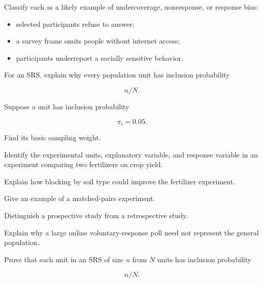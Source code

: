\begin{exercise}[2]
Classify each as a likely example of undercoverage, nonresponse, or
response bias:
\begin{itemize}
    \item selected participants refuse to answer;
    \item a survey frame omits people without internet access;
    \item participants underreport a socially sensitive behavior.
\end{itemize}
\end{exercise}

\begin{exercise}[2]
For an SRS, explain why every population unit has inclusion probability

\[
n/N.
\]
\end{exercise}

\begin{exercise}[2]
Suppose a unit has inclusion probability

\[
\pi_i=0.05.
\]

Find its basic sampling weight.
\end{exercise}

\begin{exercise}[2]
Identify the experimental units, explanatory variable, and response
variable in an experiment comparing two fertilizers on crop yield.
\end{exercise}

\begin{exercise}[2]
Explain how blocking by soil type could improve the fertilizer
experiment.
\end{exercise}

\begin{exercise}[2]
Give an example of a matched-pairs experiment.
\end{exercise}

\begin{exercise}[2]
Distinguish a prospective study from a retrospective study.
\end{exercise}

\begin{exercise}[2]
Explain why a large online voluntary-response poll need not represent the
general population.
\end{exercise}

\begin{exercise}[3]
Prove that each unit in an SRS of size \(n\) from \(N\) units has
inclusion probability

\[
n/N.
\]
\end{exercise}

